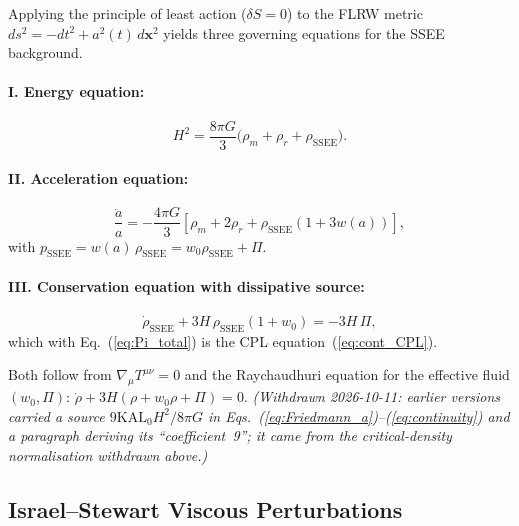 Applying the principle of least action ($\delta S = 0$) to the
FLRW metric $ds^{2} = -dt^{2} + a^{2}(t)\,d\mathbf{x}^{2}$ yields
three governing equations for the SSEE background.

\paragraph{I. Energy equation:}
\begin{equation}
  H^{2}
    = \frac{8\pi G}{3}
      \bigl(\rho_{m} + \rho_{r} + \rho_{\mathrm{SSEE}}\bigr).
  \label{eq:Friedmann_H}
\end{equation}

\paragraph{II. Acceleration equation:}
\begin{equation}
  \frac{\ddot{a}}{a}
    = -\frac{4\pi G}{3}
      \!\left[\rho_{m} + 2\rho_{r}
        + \rho_{\mathrm{SSEE}}\!\left(1 + 3w(a)\right)
      \right],
  \label{eq:Friedmann_a}
\end{equation}
with $p_{\mathrm{SSEE}} = w(a)\,\rho_{\mathrm{SSEE}} = w_0\rho_{\mathrm{SSEE}}+\Pi$.

\paragraph{III. Conservation equation with dissipative source:}
\begin{equation}
  \dot{\rho}_{\mathrm{SSEE}}
    + 3H\,\rho_{\mathrm{SSEE}}\!\left(1 + w_{0}\right)
    = -3H\,\Pi,
  \label{eq:continuity}
\end{equation}
which with Eq.~(\ref{eq:Pi_total}) is the CPL equation~(\ref{eq:cont_CPL}).

\noindent Both follow from $\nabla_{\!\mu}T^{\mu\nu}=0$ and the Raychaudhuri
equation for the effective fluid $(w_0,\Pi)$:
$\dot{\rho} + 3H(\rho + w_{0}\rho + \Pi) = 0$. \emph{(Withdrawn 2026-10-11:
earlier versions carried a source $9\mathrm{KAL}_0H^2/8\pi G$ in
Eqs.~(\ref{eq:Friedmann_a})--(\ref{eq:continuity}) and a paragraph deriving
its ``coefficient~9''; it came from the critical-density normalisation
withdrawn above.)}

\subsection{Israel--Stewart Viscous Perturbations}
\label{sec:eft:IS}

